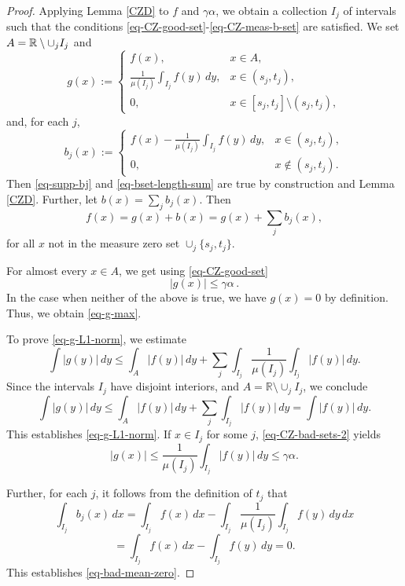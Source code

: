 {\begin{proof}
    Applying Lemma \ref{CZD} to $f$ and $\gamma\alpha$, we obtain a collection $I_j$ of intervals such that the conditions \eqref{eq-CZ-good-set}-\eqref{eq-CZ-meas-b-set} are satisfied. We set $A = {\mathbb{R}} \setminus \cup_j I_j$ and
\begin{equation}
    \label{eq-g-def}
    g(x):=\begin{cases}
     f(x), & x\in A,\\
     \frac{1}{\mu(I_j)}\int_{I_j} f(y)\, dy, &x\in (s_j, t_j),\\
     0, & x\in [s_j, t_j]\setminus (s_j, t_j),
    \end{cases}
\end{equation}
and, for each $j$,
\begin{equation}
    b_j(x):=\begin{cases}
        f(x)-\frac{1}{\mu(I_j)}\int_{I_j} f(y)\, dy, &x\in (s_j, t_j),\\
        0, & x\not\in (s_j, t_j).
    \end{cases}
\end{equation}
Then \eqref{eq-supp-bj} and \eqref{eq-bset-length-sum} are true by construction and Lemma \ref{CZD}.
Further, let $b(x)=\sum_{j} b_j(x).$
Then
\begin{equation*}
    f(x)=g(x)+b(x)=g(x)+\sum_{j} b_j(x) ,
\end{equation*}
for all $x$ not in the measure zero set $\cup_j \{s_j, t_j\}.$

For almost every $x\in A$, we get using \eqref{eq-CZ-good-set}
$$|g(x)|\leq \gamma\alpha\,.$$ In the case when neither of the above is true, we have $g(x)=0$ by definition.
Thus, we obtain \eqref{eq-g-max}.

To prove \eqref{eq-g-L1-norm}, we estimate
$$\int |g(y)|\, dy\leq \int_A |f(y)|\, dy+ \sum_{j} \int_{I_j}\frac{1}{\mu(I_j)}\int_{I_j}|f(y)|\, dy.$$
Since the intervals $I_j$ have disjoint interiors, and $A=\mathbb{R}\setminus \cup_j I_j$, we conclude
$$\int |g(y)|\, dy\leq \int_A |f(y)|\, dy+\sum_{j} \int_{I_j}|f(y)|\, dy= \int |f(y)|\, dy.$$
This establishes \eqref{eq-g-L1-norm}.
If $x\in I_j$ for some $j$, \eqref{eq-CZ-bad-sets-2} yields
$$|g(x)|\leq \frac{1}{\mu(I_j)}\int_{I_j}|f(y)|\, dy\leq \gamma\alpha.$$


Further, for each $j$, it follows from the definition of $t_j$ that
$$ \int_{I_j} b_j(x)\, dx= \int_{I_j} f(x)\, dx-\int_{I_j} \frac{1}{\mu(I_j)}\int_{I_j}f(y)\, dy\, dx$$
\begin{equation*}
    =\int_{I_j} f(x)\, dx- \int_{I_j}f(y)\, dy=0.
\end{equation*}
This establishes \eqref{eq-bad-mean-zero}.


\end{proof}}
